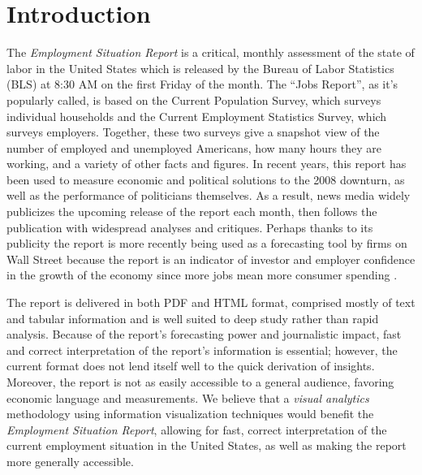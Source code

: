 \documentclass{sigchi}
\begin{document}


\section{Introduction}
The \textit{Employment Situation Report} is a critical, monthly assessment of the state of labor in the United States which is released by the Bureau of Labor Statistics (BLS) at 8:30 AM on the first Friday of the month. The ``Jobs Report'', as it's popularly called, is based on the Current Population Survey, which surveys individual households and the Current Employment Statistics Survey, which surveys employers. Together, these two surveys give a snapshot view of the number of employed and unemployed Americans, how many hours they are working, and a variety of other facts and figures. In recent years, this report has been used to measure economic and political solutions to the 2008 downturn, as well as the performance of politicians themselves. As a result, news media widely publicizes the upcoming release of the report each month, then follows the publication with widespread analyses and critiques. Perhaps thanks to its publicity the report is more recently being used as a forecasting tool by firms on Wall Street because the report is an indicator of investor and employer confidence in the growth of the economy since more jobs mean more consumer spending \cite{mahorney_what_2013}.

The report is delivered in both PDF and HTML format, comprised mostly of text and tabular information and is well suited to deep study rather than rapid analysis. Because of the report's forecasting power and journalistic impact, fast and correct interpretation of the report's information is essential; however, the current format does not lend itself well to the quick derivation of insights. Moreover, the report is not as easily accessible to a general audience, favoring economic language and measurements. We believe that a \textit{visual analytics} methodology \cite{keim_mastering_2010} using information visualization techniques would benefit the \textit{Employment Situation Report}, allowing for fast, correct interpretation of the current employment situation in the United States, as well as making the report more generally accessible.
\end{document}
